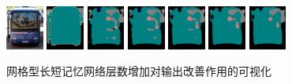 {\begin{figure}[h]
		\\
		\includegraphics[width=0.11\textwidth]{image/improvement/2007_000663.jpg}
		\enspace\enspace %
		\includegraphics[width=0.11\textwidth]{image/improvement/2007_000663.png}
		\enspace\enspace
		\includegraphics[width=0.11\textwidth]{image/improvement/2007_000663_1.png}
		\enspace\enspace
		\includegraphics[width=0.11\textwidth]{image/improvement/2007_000663_2.png}
		\enspace\enspace
		\includegraphics[width=0.11\textwidth]{image/improvement/2007_000663_3.png}
		\enspace\enspace
		\includegraphics[width=0.11\textwidth]{image/improvement/2007_000663_4.png}
		\enspace\enspace
		\includegraphics[width=0.11\textwidth]{image/improvement/2007_000663_5.png}
		\enspace\enspace
		\caption[同一网络网格型长短记忆网络时序的增加对输出改善作用的可视化]{网格型长短记忆网络层数增加对输出改善作用的可视化}
		\label{fig:improvement}
	\end{figure}
}

